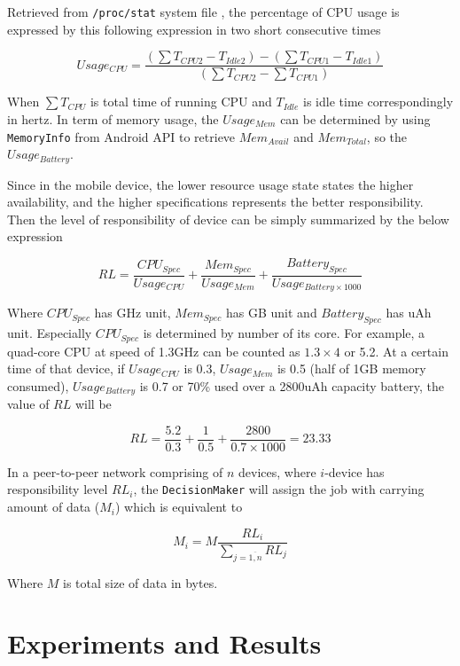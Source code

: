 \documentclass[conference]{IEEEtran}
\begin{document}
Retrieved from \texttt{/proc/stat} system file \cite{stat_explain}, the percentage of CPU usage is expressed by this following expression in two short consecutive times

$$Usage_{CPU} = \frac{(\sum{T_{CPU2}} - T_{Idle2}) - (\sum{T_{CPU1}} - T_{Idle1})}{(\sum{T_{CPU2}} - \sum{T_{CPU1}})}$$

When $\sum{T_{CPU}}$ is total time of running CPU and $T_{Idle}$ is idle time correspondingly in hertz. In term of memory usage, the $Usage_{Mem}$ can be determined by using \texttt{MemoryInfo} from Android API to retrieve $Mem_{Avail}$ and $Mem_{Total}$, so the $Usage_{Battery}$.

Since in the mobile device, the lower resource usage state states the higher availability, and the higher specifications represents the better responsibility. Then the level of responsibility of device can be simply summarized by the below expression

$$RL = \frac{CPU_{Spec}}{Usage_{CPU}} + \frac{Mem_{Spec}}{Usage_{Mem}} + \frac{Battery_{Spec}}{Usage_{Battery \times 1000}}$$

Where $CPU_{Spec}$ has GHz unit, $Mem_{Spec}$ has GB unit and $Battery_{Spec}$ has uAh unit. Especially $CPU_{Spec}$ is determined by number of its core. For example, a quad-core CPU at speed of 1.3GHz can be counted as $1.3 \times 4$ or 5.2. At a certain time of that device, if $Usage_{CPU}$ is 0.3, $Usage_{Mem}$ is 0.5 (half of 1GB memory consumed), $Usage_{Battery}$ is 0.7 or 70\% used over a 2800uAh capacity battery, the value of $RL$ will be

$$RL = \frac{5.2}{0.3} + \frac{1}{0.5} + \frac{2800}{0.7 \times 1000} = 23.33$$

In a peer-to-peer network comprising of $n$ devices, where $i$-device has responsibility level $RL_{i}$, the \texttt{DecisionMaker} will assign the job with carrying amount of data ($M_{i}$) which is equivalent to

$$M_{i} = M\frac{RL_{i}}{\sum_{j = \overline{1,n}}{RL_{j}}}$$

Where $M$ is total size of data in bytes.

\section{Experiments and Results}
\end{document}
